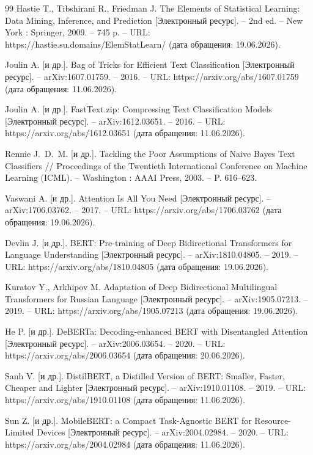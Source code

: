 \documentclass[12pt,a4paper]{report}
\providecommand{\url}[1]{#1}
\begin{document}
\begin{thebibliography}{99}
Hastie T., Tibshirani R., Friedman J. The Elements of Statistical Learning: Data Mining, Inference, and Prediction [Электронный ресурс]. -- 2nd ed. -- New York : Springer, 2009. -- 745 p. -- URL: \url{https://hastie.su.domains/ElemStatLearn/} (дата обращения: 19.06.2026).

Joulin A. [и др.]. Bag of Tricks for Efficient Text Classification [Электронный ресурс]. -- arXiv:1607.01759. -- 2016. -- URL: \url{https://arxiv.org/abs/1607.01759} (дата обращения: 11.06.2026).

Joulin A. [и др.]. FastText.zip: Compressing Text Classification Models [Электронный ресурс]. -- arXiv:1612.03651. -- 2016. -- URL: \url{https://arxiv.org/abs/1612.03651} (дата обращения: 11.06.2026).

Rennie J.~D.~M. [и др.]. Tackling the Poor Assumptions of Naive Bayes Text Classifiers // Proceedings of the Twentieth International Conference on Machine Learning (ICML). -- Washington : AAAI Press, 2003. -- P. 616--623.

Vaswani A. [и др.]. Attention Is All You Need [Электронный ресурс]. -- arXiv:1706.03762. -- 2017. -- URL: \url{https://arxiv.org/abs/1706.03762} (дата обращения: 19.06.2026).

Devlin J. [и др.]. BERT: Pre-training of Deep Bidirectional Transformers for Language Understanding [Электронный ресурс]. -- arXiv:1810.04805. -- 2019. -- URL: \url{https://arxiv.org/abs/1810.04805} (дата обращения: 19.06.2026).

Kuratov Y., Arkhipov M. Adaptation of Deep Bidirectional Multilingual Transformers for Russian Language [Электронный ресурс]. -- arXiv:1905.07213. -- 2019. -- URL: \url{https://arxiv.org/abs/1905.07213} (дата обращения: 19.06.2026).

He P. [и др.]. DeBERTa: Decoding-enhanced BERT with Disentangled Attention [Электронный ресурс]. -- arXiv:2006.03654. -- 2020. -- URL: \url{https://arxiv.org/abs/2006.03654} (дата обращения: 20.06.2026).

Sanh V. [и др.]. DistilBERT, a Distilled Version of BERT: Smaller, Faster, Cheaper and Lighter [Электронный ресурс]. -- arXiv:1910.01108. -- 2019. -- URL: \url{https://arxiv.org/abs/1910.01108} (дата обращения: 11.06.2026).

Sun Z. [и др.]. MobileBERT: a Compact Task-Agnostic BERT for Resource-Limited Devices [Электронный ресурс]. -- arXiv:2004.02984. -- 2020. -- URL: \url{https://arxiv.org/abs/2004.02984} (дата обращения: 11.06.2026).


\end{thebibliography}
\end{document}
